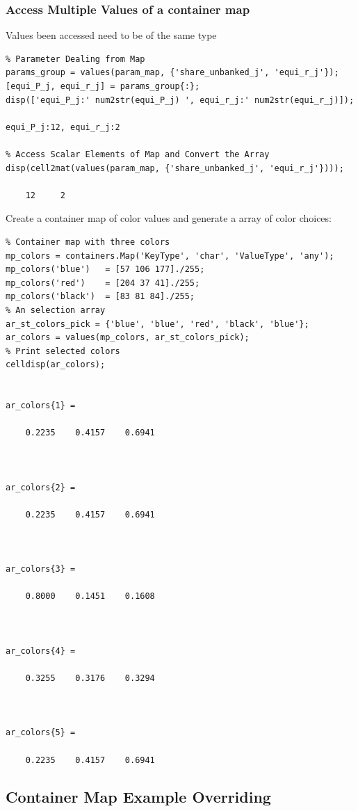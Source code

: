 \documentclass[
]{book}
\begin{document}
\hypertarget{access-multiple-values-of-a-container-map}{%
\subsubsection{Access Multiple Values of a container map}\label{access-multiple-values-of-a-container-map}}

Values been accessed need to be of the same type

\begin{verbatim}
% Parameter Dealing from Map
params_group = values(param_map, {'share_unbanked_j', 'equi_r_j'});
[equi_P_j, equi_r_j] = params_group{:};
disp(['equi_P_j:' num2str(equi_P_j) ', equi_r_j:' num2str(equi_r_j)]);

equi_P_j:12, equi_r_j:2

% Access Scalar Elements of Map and Convert the Array
disp(cell2mat(values(param_map, {'share_unbanked_j', 'equi_r_j'})));

    12     2
\end{verbatim}

Create a container map of color values and generate a array of color
choices:

\begin{verbatim}
% Container map with three colors
mp_colors = containers.Map('KeyType', 'char', 'ValueType', 'any');
mp_colors('blue')   = [57 106 177]./255;
mp_colors('red')    = [204 37 41]./255;
mp_colors('black')  = [83 81 84]./255;
% An selection array
ar_st_colors_pick = {'blue', 'blue', 'red', 'black', 'blue'};
ar_colors = values(mp_colors, ar_st_colors_pick);
% Print selected colors
celldisp(ar_colors);


ar_colors{1} =
 
    0.2235    0.4157    0.6941



ar_colors{2} =
 
    0.2235    0.4157    0.6941



ar_colors{3} =
 
    0.8000    0.1451    0.1608



ar_colors{4} =
 
    0.3255    0.3176    0.3294



ar_colors{5} =
 
    0.2235    0.4157    0.6941
\end{verbatim}

\hypertarget{container-map-example-overriding}{%
\subsection{Container Map Example Overriding}\label{container-map-example-overriding}}
\end{document}
